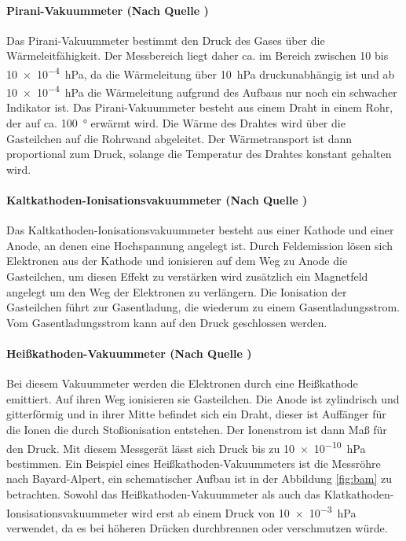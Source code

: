 \paragraph{Pirani-Vakuummeter (Nach Quelle \cite{pfeiffer:mg})}
Das Pirani-Vakuummeter bestimmt den Druck des Gases über die Wärmeleitfähigkeit. Der Messbereich
liegt daher ca. im Bereich zwischen 10 bis \SI{10e-4}{\hecto\pascal}, da die Wärmeleitung
über \SI{10}{\hecto\pascal} druckunabhängig ist und ab \SI{10e-4}{\hecto\pascal} die Wärmeleitung
aufgrund des Aufbaus nur noch ein schwacher Indikator ist. Das Pirani-Vakuummeter besteht aus einem
Draht in einem Rohr, der auf ca. \SI{100}{\degree} erwärmt wird. Die Wärme des Drahtes wird über
die Gasteilchen auf die Rohrwand abgeleitet. Der Wärmetransport ist dann proportional zum Druck,
solange die Temperatur des Drahtes konstant gehalten wird.

\paragraph{Kaltkathoden-Ionisationsvakuummeter (Nach Quelle \cite{pfeiffer:mg})}
Das Kaltkathoden-Ionisationsvakuummeter besteht aus einer Kathode und einer Anode, an denen eine
Hochspannung angelegt ist. Durch Feldemission lösen sich Elektronen aus der Kathode und ionisieren
auf dem Weg zu Anode die Gasteilchen, um diesen Effekt zu verstärken wird zusätzlich ein
Magnetfeld angelegt um den Weg der Elektronen zu verlängern. Die Ionisation der Gasteilchen
führt zur Gasentladung, die wiederum zu einem Gasentladungsstrom. Vom Gasentladungsstrom
kann auf den Druck geschlossen werden.

\paragraph{Heißkathoden-Vakuummeter (Nach Quelle \cite{pfeiffer:mg})}
Bei diesem Vakuummeter werden die Elektronen durch eine Heißkathode emittiert. Auf ihren Weg
ionisieren sie Gasteilchen. Die Anode ist zylindrisch und gitterförmig und in ihrer Mitte befindet
sich ein Draht, dieser ist Auffänger für die Ionen die durch Stoßionisation entstehen. Der
Ionenstrom ist dann Maß für den Druck. Mit diesem Messgerät lässt sich Druck bis zu
\SI{10e-10}{\hecto\pascal} bestimmen. Ein Beispiel eines Heißkathoden-Vakuummeters ist die
Messröhre nach Bayard-Alpert, ein schematischer Aufbau ist in der Abbildung \ref{fig:bam} zu
betrachten.
\newline
Sowohl das Heißkathoden-Vakuummeter als auch das Klatkathoden-Ionsisationsvakuummeter wird erst ab
einem Druck von \SI{10e-3}{\hecto\pascal} verwendet, da es bei höheren Drücken durchbrennen oder
verschmutzen würde.

